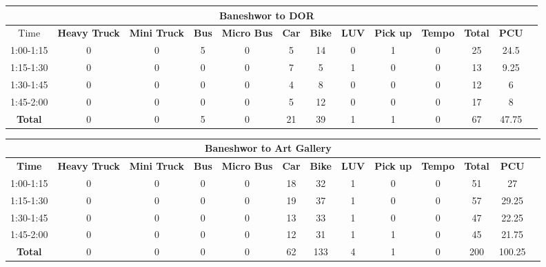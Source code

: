 \begin{landscape}
\centering
\begin{table}[h!]
\centering
\begin{tabular}{|c|c|c|c|c|c|c|c|c|c|c|c|c|}
    \hline
    \multicolumn{12}{|c|}{\textbf{Baneshwor to DOR}} \\
    \hline
        Time & \textbf{Heavy Truck} & \textbf{Mini Truck} & \textbf{Bus} & \textbf{Micro Bus} & \textbf{Car} & \textbf{Bike} & \textbf{LUV} & \textbf{Pick up} & \textbf{Tempo} & \textbf{\textbf{Total}} & \textbf{PCU} \\
    \hline
1:00-1:15	&0	&0	&5	&0	&5	&14	&0	&1	&0	&25	&24.5 \\ \hline
1:15-1:30	&0	&0	&0	&0	&7	&5	&1	&0	&0	&13	&9.25 \\ \hline
1:30-1:45	&0	&0	&0	&0	&4	&8	&0	&0	&0	&12	&6 \\ \hline
1:45-2:00	&0	&0	&0	&0	&5	&12	&0	&0	&0	&17	&8 \\ \hline
\textbf{Total}	&0	&0	&5	&0	&21	&39	&1	&1	&0	&67	&47.75 \\ \hline

\end{tabular}

\vspace{0.5cm}

\begin{tabular}{|c|c|c|c|c|c|c|c|c|c|c|c|c|}
    \hline
    \multicolumn{12}{|c|}{\textbf{Baneshwor to Art Gallery}} \\
    \hline
    \textbf{Time} & \textbf{Heavy Truck} & \textbf{Mini Truck} & \textbf{Bus} & \textbf{Micro Bus} & \textbf{Car} & \textbf{Bike} & \textbf{LUV} & \textbf{Pick up} & \textbf{Tempo} & \textbf{\textbf{Total}} & \textbf{PCU} \\
    \hline
1:00-1:15	&0	&0	&0	&0	&18	&32	&1	&0	&0	&51	&27 \\ \hline
1:15-1:30	&0	&0	&0	&0	&19	&37	&1	&0	&0	&57	&29.25 \\ \hline
1:30-1:45	&0	&0	&0	&0	&13	&33	&1	&0	&0	&47	&22.25 \\ \hline
1:45-2:00	&0	&0	&0	&0	&12	&31	&1	&1	&0	&45	&21.75 \\ \hline
\textbf{Total}	&0	&0	&0	&0	&62	&133	&4	&1	&0	&200	&100.25 \\ \hline

\end{tabular}



\vspace{0.5cm}


\end{table}
\end{landscape}

